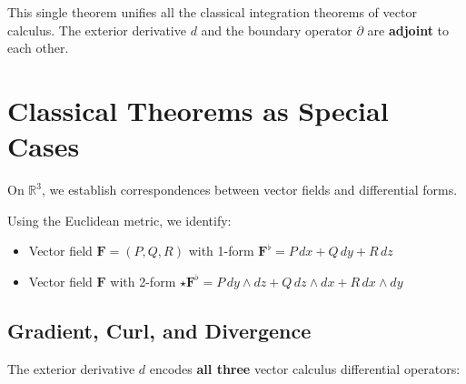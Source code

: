 \begin{remark}
    This single theorem unifies all the classical integration theorems of vector calculus. The exterior derivative $d$ and the boundary operator $\partial$ are \textbf{adjoint} to each other.
\end{remark}

\section{Classical Theorems as Special Cases}

On $\mathbb{R}^3$, we establish correspondences between vector fields and differential forms.

\begin{definition}
    Using the Euclidean metric, we identify:
    \begin{itemize}
        \item Vector field $\mathbf{F} = (P, Q, R)$ with 1-form $\mathbf{F}^\flat = P\,dx + Q\,dy + R\,dz$
        \item Vector field $\mathbf{F}$ with 2-form $\star\mathbf{F}^\flat = P\,dy \wedge dz + Q\,dz \wedge dx + R\,dx \wedge dy$
    \end{itemize}
\end{definition}

\subsection{Gradient, Curl, and Divergence}

The exterior derivative $d$ encodes \textbf{all three} vector calculus differential operators:

